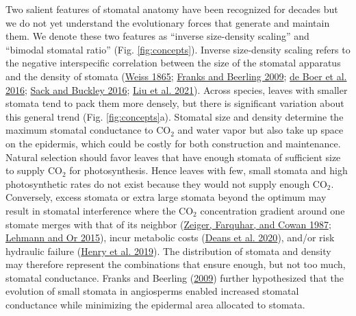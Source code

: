 \documentclass[
  12pt,
]{article}
\begin{document}
Two salient features of stomatal anatomy have been recognized for decades but we do not yet understand the evolutionary forces that generate and maintain them. We denote these two features as ``inverse size-density scaling'' and ``bimodal stomatal ratio'' (Fig. \ref{fig:concepts}). Inverse size-density scaling refers to the negative interspecific correlation between the size of the stomatal apparatus and the density of stomata (\protect\hyperlink{ref-weiss_untersuchungen_1865}{Weiss 1865}; \protect\hyperlink{ref-franks_maximum_2009}{Franks and Beerling 2009}; \protect\hyperlink{ref-de_boer_optimal_2016}{de Boer et al. 2016}; \protect\hyperlink{ref-sack_developmental_2016}{Sack and Buckley 2016}; \protect\hyperlink{ref-liu_scaling_2021}{Liu et al. 2021}). Across species, leaves with smaller stomata tend to pack them more densely, but there is significant variation about this general trend (Fig. \ref{fig:concepts}a). Stomatal size and density determine the maximum stomatal conductance to CO\(_2\) and water vapor but also take up space on the epidermis, which could be costly for both construction and maintenance. Natural selection should favor leaves that have enough stomata of sufficient size to supply CO\(_2\) for photosynthesis. Hence leaves with few, small stomata and high photosynthetic rates do not exist because they would not supply enough CO\(_2\). Conversely, excess stomata or extra large stomata beyond the optimum may result in stomatal interference where the CO\(_2\) concentration gradient around one stomate merges with that of its neighbor (\protect\hyperlink{ref-zeiger_stomatal_1987}{Zeiger, Farquhar, and Cowan 1987}; \protect\hyperlink{ref-lehmann_effects_2015}{Lehmann and Or 2015}), incur metabolic costs (\protect\hyperlink{ref-deans_optimization_2020}{Deans et al. 2020}), and/or risk hydraulic failure (\protect\hyperlink{ref-henry_stomatal_2019}{Henry et al. 2019}). The distribution of stomata and density may therefore represent the combinations that ensure enough, but not too much, stomatal conductance. Franks and Beerling (\protect\hyperlink{ref-franks_maximum_2009}{2009}) further hypothesized that the evolution of small stomata in angiosperms enabled increased stomatal conductance while minimizing the epidermal area allocated to stomata.
\end{document}
